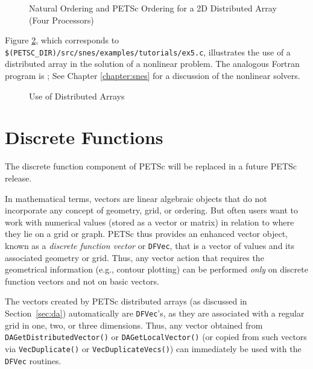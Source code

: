 \begin{figure}[tb]
\centerline{}
\caption{Natural Ordering and PETSc Ordering for a 2D Distributed Array (Four Processors)}
\label{fig:daao}
\end{figure}

Figure \ref{fig:daexample}, which corresponds to
{\tt \$(PETSC\_DIR)/src/snes/examples/tutorials/ex5.c},
illustrates the use of a distributed array in the solution of
a nonlinear problem.  The analogous Fortran program is
;
See Chapter \ref{chapter:snes} for a discussion of the nonlinear
solvers.

\begin{figure}[H]
{\small
{}
}
\caption{Use of Distributed Arrays}
\label{fig:daexample}
\end{figure}

\section{Discrete Functions}

The discrete function component of PETSc will be replaced in a future 
PETSc release.

\medskip \medskip

In mathematical terms, vectors are linear algebraic objects that do
not incorporate any concept of geometry, grid, or ordering.  But often
users want to work with numerical values (stored as a vector or
matrix) in relation to where they lie on a grid or graph. PETSc thus
provides an enhanced vector object, known as a {\em discrete function
vector} or {\tt DFVec}, that is a vector of values and its associated
geometry or grid.  Thus, any vector action that requires the
geometrical information (e.g., contour plotting) can be performed {\em only} on
discrete function vectors and not on basic vectors.

The vectors created by PETSc distributed arrays (as discussed in
Section~\ref{sec:da}) automatically are {\tt DFVec}'s, as they 
are associated with a regular grid in one, two, or three dimensions.  Thus,
any vector obtained from {\tt DAGetDistributedVector()} or
{\tt DAGetLocalVector()} (or copied from such vectors via {\tt VecDuplicate()}
or {\tt VecDuplicateVecs()}) can immediately be used with the {\tt DFVec}
routines.


